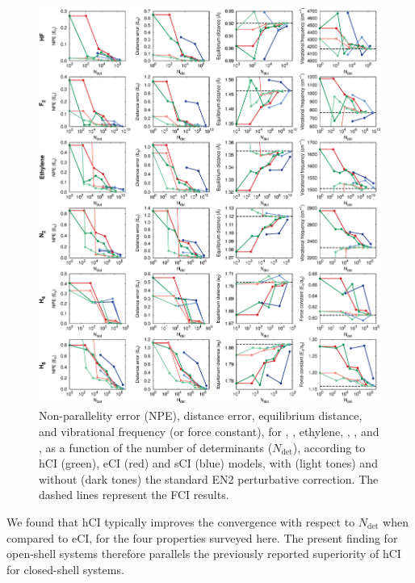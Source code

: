 \documentclass[aip,jcp,reprint,noshowkeys,superscriptaddress]{revtex4-1}
\newcommand{\Ndet}{N_\text{det}}
\begin{document}
\begin{figure}%
\includegraphics[width=1.0\linewidth]{plot_all_closed}
\caption{
Non-parallelity error (NPE), distance error, equilibrium distance, and vibrational frequency (or force constant), for , , ethylene, , , and , 
as a function of the number of determinants ($\Ndet$), according to hCI (green), eCI (red) and sCI (blue) models,
with (light tones) and without (dark tones) the standard EN2 perturbative correction.
The dashed lines represent the FCI results.}
\label{fig:plot_all_closed}
\end{figure}

We found that hCI typically improves the convergence with respect to $\Ndet$ when compared to eCI, for the four properties surveyed here.
The present finding for open-shell systems therefore parallels the previously reported superiority of hCI for closed-shell systems. \cite{Kossoski_2022}
\end{document}
